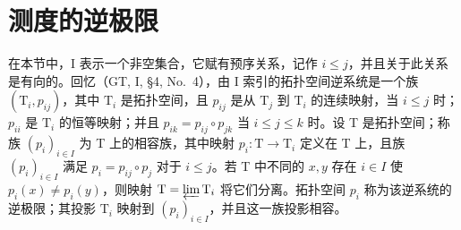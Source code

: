 \section{测度的逆极限}

在本节中，I 表示一个非空集合，它赋有预序关系，记作 \(i \leqslant j\)，并且关于此关系是有向的。回忆（GT, I, §4, No.~4），由 I 索引的拓扑空间逆系统是一个族 \((\mathrm{T}_i, p_{ij})\)，其中 \(\mathrm{T}_i\) 是拓扑空间，且 \(p_{ij}\) 是从 \(\mathrm{T}_j\) 到 \(\mathrm{T}_i\) 的连续映射，当 \(i \leqslant j\) 时；\(p_{ii}\) 是 \(\mathrm{T}_i\) 的恒等映射；并且 \(p_{ik} = p_{ij} \circ p_{jk}\) 当 \(i \leqslant j \leqslant k\) 时。设 T 是拓扑空间；称族 \((p_i)_{i \in I}\) 为 T 上的相容族，其中映射 \(p_i: \mathrm{T} \to \mathrm{T}_i\) 定义在 T 上，且族 \((p_i)_{i \in I}\) 满足 \(p_i = p_{ij} \circ p_j\) 对于 \(i \leqslant j\)。若 T 中不同的 \(x, y\) 存在 \(i \in I\) 使 \(p_i(x) \neq p_i(y)\)，则映射 \(\mathrm{T} = \varprojlim \mathrm{T}_i\) 将它们分离。拓扑空间 \(p_i\) 称为该逆系统的逆极限；其投影 \(\mathrm{T}_i\) 映射到 \((p_i)_{i \in I}\)，并且这一族投影相容。

